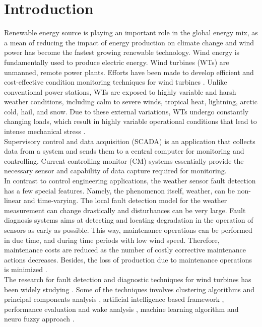 \documentclass[conference]{IEEEtran}
\begin{document}
\section{Introduction}
Renewable energy source is playing an important role in the global energy mix, as a mean of reducing the impact of energy production on climate change and wind power has become the fastest growing renewable technology. 
Wind energy is fundamentally used to produce electric energy. Wind turbines (WTs) are unmanned, remote power plants.  Efforts have been made to develop efficient and cost-effective condition monitoring techniques for wind turbines \cite{yang2014wind}. Unlike conventional power stations, WTs are exposed to highly variable and harsh weather conditions, including calm to severe winds, tropical heat, lightning, arctic cold, hail, and snow. Due to these external variations, WTs undergo constantly changing loads, which result in highly variable operational conditions that lead to intense mechanical stress \cite{ribrant2006thesis}. \\
Supervisory control and data acquisition (SCADA) is an application that collects data from a system and sends them to a central computer for monitoring and controlling. Current controlling monitor (CM) systems essentially provide the necessary sensor and capability of data capture required for monitoring.\\
In contrast to control engineering applications, the weather sensor fault detection has a few special features. Namely, the phenomenon itself, weather, can be non-linear and time-varying. The local fault detection model for the weather measurement can change drastically and disturbances can be very large. Fault diagnosis systems aims at detecting and locating degradation in the operation of sensors as early as possible. This way, maintenance operations can be performed in due time, and during time periods with low wind speed. Therefore, maintenance costs are reduced as the number of costly corrective maintenance actions decreases. Besides, the loss of production due to maintenance operations is minimized \cite{luo2014wind}.\\
The research for  fault detection and diagnostic techniques for wind turbines has been widely studying  \cite{tchakoua2014wind,wymore2015survey,lu2009review}. Some of the techniques involves
clustering algorithms and principal components analysis \cite{kim2011use}, artificial intelligence based framework \cite{wang2014scada}, performance evaluation and wake analysis \cite{astolfi2016mathematical}, machine learning algorithm \cite{kusiak2011prediction,schlechtingen2011comparative} and neuro fuzzy approach \cite{schlechtingen2012condition}.\\
\end{document}
